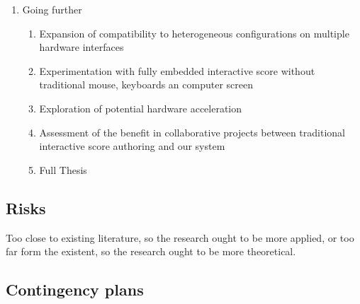 \documentclass[journal,onecolumn]{IEEEtran}
\begin{document}
\begin{enumerate}
\begin{enumerate}
        \item Expanding original set of hot keys on the score software to reach full editing capabilities without the mouse on the original user interface
        \item Cross examining keyboard based interactions in the area of live coding and software accessibility for the sight impaired
        \item Evaluation of necessary textual feedback (data can only be communicated to the user through text)
        \item Exploration of preformative substitute to menus (and dreaded "menu diving")
        \item Experimentation of more unusual uses of hardware interfaces (like the patching environment of the Empress Zoya\footnote{Official web page: empresseffects.com/products/zoia})
        \item Publication of the thesis's forth chapter, accompanying an official release of the system considered "production ready".
    \end{enumerate}
    \item Going further
    \begin{enumerate}
        \item Expansion of compatibility to heterogeneous configurations on multiple hardware interfaces
        \item Experimentation with fully embedded interactive score without traditional mouse, keyboards an computer screen
        \item Exploration of potential hardware acceleration
        \item Assessment of the benefit in collaborative projects between traditional interactive score authoring and our system
        \item Full Thesis
    \end{enumerate}
\end{enumerate}

\subsection{Risks}
Too close to existing literature, so the research ought to be more applied, or too far form the existent, so the research ought to be more theoretical.
\subsection{Contingency plans}
\end{document}
